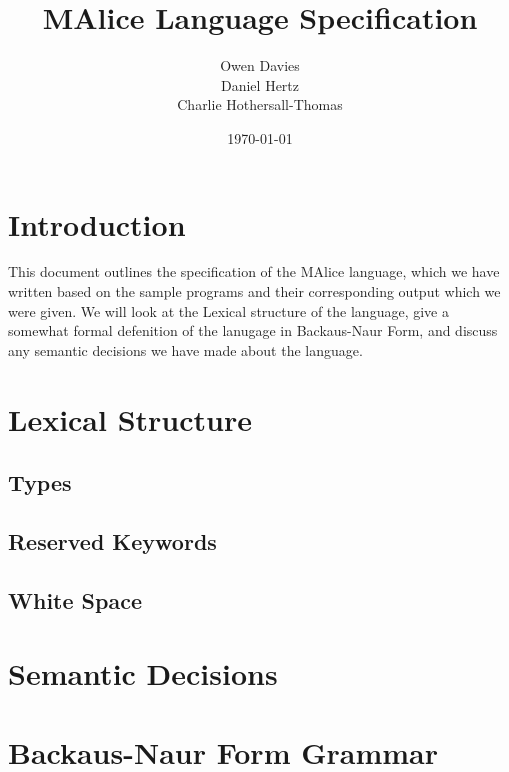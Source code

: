 \documentclass[a4, 11pt]{article}
\begin{document}
\title{\huge{MAlice Language Specification}}
\author{Owen Davies\\Daniel Hertz\\Charlie Hothersall-Thomas}
\date{\today}

\maketitle

\section*{Introduction}
This document outlines the specification of the MAlice language, which we have 
written based on the sample programs and their corresponding output which we 
were given. We will look at the Lexical structure of the language, give a 
somewhat formal defenition of the lanugage in Backaus-Naur Form, and discuss 
any semantic decisions we have made about the language.

\section*{Lexical Structure}
\subsection*{Types}
\subsection*{Reserved Keywords}
\subsection*{White Space}

\section*{Semantic Decisions}

\section*{Backaus-Naur Form Grammar} 
\end{document}
